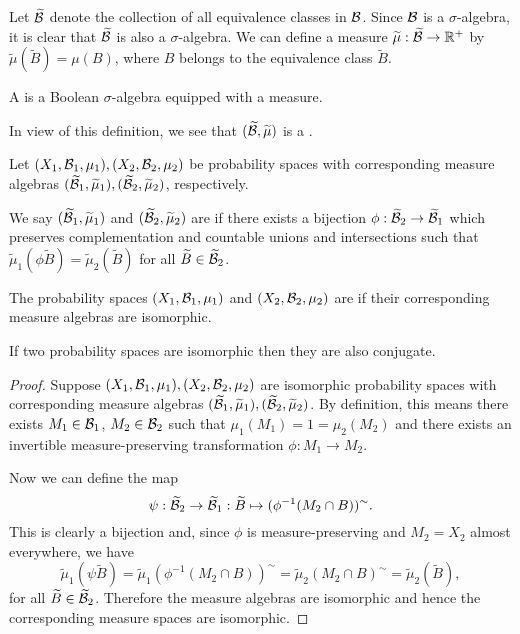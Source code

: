 Let $\widetilde{\mathcal{B}}$ denote the collection of all equivalence classes in $\mathcal{B}$. Since $\mathcal{B}$ is a $\sigma$-algebra, it is clear that $\widetilde{\mathcal{B}}$ is also a $\sigma$-algebra. We can define a measure $\widetilde{\mu} : \widetilde{\mathcal{B}} \to \mathbb{R}^+$ by $\tilde{\mu}(\tilde{B}) = \mu(B)$, where $B$ belongs to the equivalence class $\tilde{B}$.

\begin{definition}
	A  is a Boolean $\sigma$-algebra equipped with a measure.
\end{definition}

In view of this definition, we see that $(\widetilde{\mathcal{B}}, \widetilde{\mu})$ is a .

\begin{definition}
	Let $(X_1, \mathcal{B}_1, \mu_1), (X_2, \mathcal{B}_2, \mu_2)$ be probability spaces with corresponding measure algebras $(\widetilde{\mathcal{B}}_1, \widetilde{\mu}_1), (\widetilde{\mathcal{B}}_2, \widetilde{\mu}_2)$, respectively.
	
	We say $(\widetilde{\mathcal{B}}_1, \widetilde{\mu}_1)$ and $(\widetilde{\mathcal{B}}_2, \widetilde{\mu}_2)$ are  if there exists a bijection $\phi : \widetilde{\mathcal{B}}_2 \to \widetilde{\mathcal{B}}_1$ which preserves complementation and countable unions and intersections such that $\tilde{\mu}_1(\phi \tilde{B}) = \tilde{\mu}_2(\tilde{B})$ for all $\widetilde{B} \in \widetilde{\mathcal{B}}_2$.
	
	The probability spaces $(X_1, \mathcal{B}_1, \mu_1)$ and $(X_2, \mathcal{B}_2, \mu_2)$ are  if their corresponding measure algebras are isomorphic.
\end{definition}

\begin{proposition}
	If two probability spaces are isomorphic then they are also conjugate.
	\begin{proof}
		Suppose $(X_1, \mathcal{B}_1, \mu_1), (X_2, \mathcal{B}_2, \mu_2)$ are isomorphic probability spaces with corresponding measure algebras $(\widetilde{\mathcal{B}}_1, \widetilde{\mu}_1), (\widetilde{\mathcal{B}}_2, \widetilde{\mu}_2)$. By definition, this means there exists $M_1 \in \mathcal{B}_1$, $M_2 \in \mathcal{B}_2$ such that $\mu_1(M_1) = 1 = \mu_2(M_2)$ and there exists an invertible measure-preserving transformation $\phi: M_1 \to M_2$.
		
		Now we can define the map
		\[
			\psi : \widetilde{\mathcal{B}}_2 \to \widetilde{\mathcal{B}}_1 : \widetilde{B} \mapsto (\phi^{-1}(M_2 \cap B))^\sim.
		\]
		This is clearly a bijection and, since $\phi$ is measure-preserving and $M_2 = X_2$ almost everywhere, we have
		\[
			\tilde{\mu}_1(\psi\tilde{B}) = \tilde{\mu}_1(\phi^{-1}(M_2 \cap B))^\sim = \tilde{\mu}_2(M_2 \cap B)^\sim = \tilde{\mu}_2(\tilde{B}),
		\]
		for all $\widetilde{B} \in \widetilde{\mathcal{B}}_2$. Therefore the measure algebras are isomorphic and hence the corresponding measure spaces are isomorphic.
	\end{proof}
\end{proposition}

